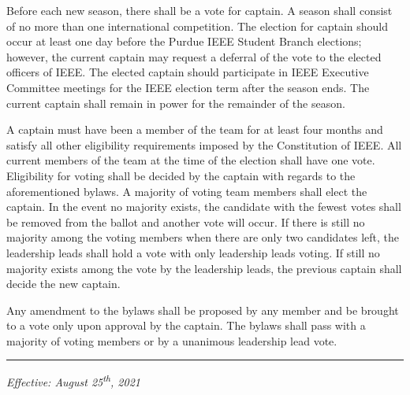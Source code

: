 \documentclass[12pt]{constitution}
\begin{document}
\label{art:elections}

Before each new season, there shall be a vote for captain. A season shall consist of no more than one international competition. The election for captain should occur at least one day before the Purdue IEEE Student Branch elections; however, the current captain may request a deferral of the vote to the elected officers of IEEE. The elected captain should participate in IEEE Executive Committee meetings for the IEEE election term after the season ends. The current captain shall remain in power for the remainder of the season.

A captain must have been a member of the team for at least four months and satisfy all other eligibility requirements imposed by the Constitution of IEEE. All current members of the team at the time of the election shall have one vote. Eligibility for voting shall be decided by the captain with regards to the aforementioned bylaws. A majority of voting team members shall elect the captain. In the event no majority exists, the candidate with the fewest votes shall be removed from the ballot and another vote will occur. If there is still no majority among the voting members when there are only two candidates left, the leadership leads shall hold a vote with only leadership leads voting. If still no majority exists among the vote by the leadership leads, the previous captain shall decide the new captain.


\label{art:procedure}
Any amendment to the bylaws shall be proposed by any member and be brought to a vote only upon approval by the captain. The bylaws shall pass with a majority of voting members or by a unanimous leadership lead vote.


\vspace{12pt}
\hrule

\textit{Effective: August 25\textsuperscript{th}, 2021}


\setcounter{tocdepth}{1}
\end{document}
